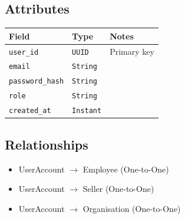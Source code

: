 \documentclass[a4paper,11pt]{article}
\begin{document}
\subsection*{Attributes}
\begin{longtable}{|p{4cm}|p{3cm}|p{6cm}|}
\hline
\textbf{Field} & \textbf{Type} & \textbf{Notes} \\
\hline
\texttt{user\_id} & \texttt{UUID} & Primary key \\
\texttt{email} & \texttt{String} &  \\
\texttt{password\_hash} & \texttt{String} &  \\
\texttt{role} & \texttt{String} &  \\
\texttt{created\_at} & \texttt{Instant} &  \\
\hline



\end{longtable}

\subsection*{Relationships}
\begin{itemize}
  \item UserAccount $\rightarrow$ Employee (One-to-One)
  \item UserAccount $\rightarrow$ Seller (One-to-One)
  \item UserAccount $\rightarrow$ Organisation (One-to-One)

\end{itemize}
\end{document}
